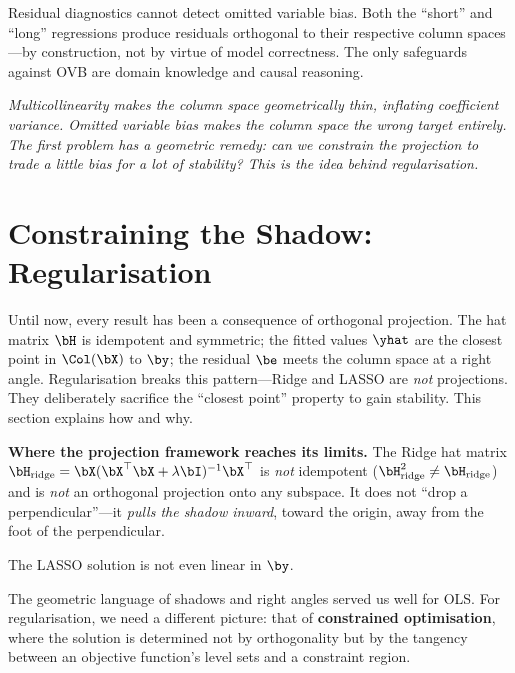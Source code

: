 \begin{remark}
Residual diagnostics cannot detect omitted variable bias. Both the
``short'' and ``long'' regressions produce residuals orthogonal to
their respective column spaces---by construction, not by virtue of
model correctness. The only safeguards against OVB are domain
knowledge and causal reasoning.
\end{remark}

\medskip
\noindent\textit{Multicollinearity makes the column space geometrically
thin, inflating coefficient variance.
Omitted variable bias makes the column space the wrong target entirely.
The first problem has a geometric remedy: can we \emph{constrain}
the projection to trade a little bias for a lot of stability?
This is the idea behind regularisation.}


\section{Constraining the Shadow: Regularisation}\label{sec:regularisation}

Until now, every result has been a consequence of orthogonal projection.
The hat matrix $\bH$ is idempotent and symmetric; the fitted values
$\yhat$ are the closest point in $\Col(\bX)$ to $\by$; the residual
$\be$ meets the column space at a right angle.
Regularisation breaks this pattern---Ridge and LASSO are \emph{not}
projections.
They deliberately sacrifice the ``closest point'' property to gain
stability.
This section explains how and why.

\begin{warning}
\textbf{Where the projection framework reaches its limits.}
The Ridge hat matrix
$\bH_{\text{ridge}} = \bX(\bX^\top\bX+\lambda\bI)^{-1}\bX^\top$
is \emph{not} idempotent
($\bH_{\text{ridge}}^2 \neq \bH_{\text{ridge}}$) and is \emph{not}
an orthogonal projection onto any subspace.
It does not ``drop a perpendicular''---it \emph{pulls the shadow
inward}, toward the origin, away from the foot of the perpendicular.

The LASSO solution is not even linear in $\by$.

The geometric language of shadows and right angles served us well for
OLS\@.  For regularisation, we need a different picture: that of
\textbf{constrained optimisation}, where the solution is determined
not by orthogonality but by the tangency between an objective function's
level sets and a constraint region.
\end{warning}


